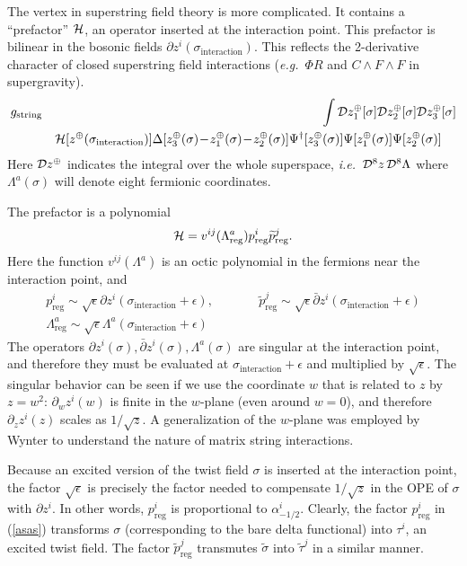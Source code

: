 \documentclass[nohyper,12pt,letterpaper]{JHEP3}
\def\calD{{\cal D}}
\def\calH{{\cal H}}
\def \tilde{\widetilde}
\def \eqref#1{(\ref{#1})}
\def \eqn#1#2{\begin{equation}#2\label{#1}\end{equation}}
\def \gs{g_{\mathrm{string}}}
\def \inte{{\mathrm{interaction}}}
\begin{document}
The vertex in superstring field theory is more complicated. It
contains a ``prefactor'' ${\cal H}$, an operator inserted at the
interaction point.  This prefactor is bilinear in the bosonic fields
$\partial z^i(\sigma_\inte)$.  This reflects the 2-derivative
character of closed superstring field interactions ({\it e.g.}\ $\Phi
R$ and $C \wedge F \wedge F$ in supergravity).
%
\begin{eqnarray}
&\gs&\int \calD z_1^\oplus[\sigma]
\calD z_2^\oplus[\sigma]
\calD z_3^\oplus[\sigma]\\
&\,&{\cal H}[z^\oplus(\sigma_\inte)]
\Delta[z_3^\oplus(\sigma)\!-\!z_1^\oplus(\sigma)\!-\!z_2^\oplus(\sigma)]
\Psi^\dagger[z_3^\oplus(\sigma)]
\Psi[z_1^\oplus(\sigma)]\Psi[z_2^\oplus(\sigma)]\quad\,
\end{eqnarray}
%
Here $\calD z^\oplus$ indicates the integral over the whole
superspace, {\it i.e.}\ $\calD^8 z\, \calD^8\Lambda$ where
$\Lambda^a(\sigma)$ will denote eight fermionic coordinates.

The prefactor \cite{brinkgs} is a polynomial
%
\eqn{asas}{\calH=v^{ij}(\Lambda^a_{\mathrm{reg}})p_{\mathrm{reg}}^i \tilde
p_{\mathrm{reg}}^j.}
%
Here the function $v^{ij}(\Lambda^a)$ is an octic polynomial in the
fermions near the interaction point, and
%
\begin{eqnarray}
p_{\mathrm{reg}}^i\sim \sqrt{\epsilon}\partial z^i(\sigma_\inte+\epsilon),
&\qquad&
\tilde p_{\mathrm{reg}}^j\sim\sqrt{\epsilon}\bar\partial
z^i(\sigma_\inte+\epsilon)\\
\Lambda^a_{\mathrm{reg}}\sim \sqrt{\epsilon}\Lambda^a
(\sigma_\inte+\epsilon)
\end{eqnarray}
%
The operators $\partial z^i(\sigma),\bar\partial
z^i(\sigma),\Lambda^a(\sigma)$ are singular at the interaction point,
and therefore they must be evaluated at $\sigma_\inte+\epsilon$ and
multiplied by $\sqrt{\epsilon}$. The singular behavior can be seen if
we use the coordinate $w$ that is related to $z$ by $z=w^2$:
$\partial_w z^i(w)$ is finite in the $w$-plane (even around $w=0$),
and therefore $\partial_z z^i(z)$ scales as $1/ \sqrt{z}$. A
generalization of the $w$-plane was employed by Wynter \cite{wynter}
to understand the nature of matrix string interactions.

Because an excited version of the twist field $\sigma$ is inserted at
the interaction point, the factor $\sqrt{\epsilon}$ is precisely the
factor needed to compensate $1/\sqrt{z}$ in the OPE of $\sigma$ with
$\partial z^i$. In other words, $p_{\mathrm{reg}}^i$ is proportional
to $\alpha_{-1/2}^i$. Clearly, the factor $p_{\mathrm{reg}}^i$ in
\eqref{asas} transforms $\sigma$ (corresponding to the bare delta
functional) into $\tau^i$, an excited twist field. The factor $\tilde
p_{\mathrm{reg}}^j$ transmutes $\tilde \sigma$ into $\tilde \tau^j$ in a
similar manner.
\end{document}
